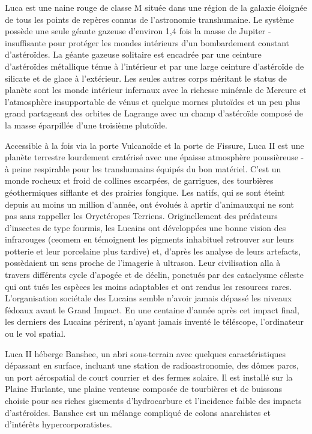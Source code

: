 Luca est une naine rouge de classe M située dans une région de la galaxie éloignée de tous les points de repères connus de l'astronomie transhumaine. Le système possède une seule géante gazeuse d'environ 1,4 fois la masse de Jupiter - insuffisante pour protéger les mondes intérieurs d'un bombardement constant d'astéroïdes. La géante gazeuse solitaire est encadrée par une ceinture d'astéroïdes métallique ténue à l'intérieur et par une large ceinture d'astéroïde de silicate et de glace à l'extérieur. Les seules autres corps méritant le status de planète sont les monde intérieur infernaux avec la richesse minérale de Mercure et l'atmosphère insupportable de vénus et quelque mornes plutoïdes et un peu plus grand partageant des orbites de Lagrange avec un champ d'astéroïde composé de la masse éparpillée d'une troisième plutoïde. 

Accessible à la fois via la porte Vulcanoïde et la porte de Fissure, Luca II est une planète terrestre lourdement cratérisé avec une épaisse atmosphère poussièreuse - à peine respirable pour les transhumains équipés du bon matériel. C'est un monde rocheux et froid de collines escarpées, de garrigues, des tourbières géothermiques sifflante et des prairies fongique. Les natifs, qui se sont éteint depuis au moins un million d'année, ont évolués à aprtir d'animauxqui ne sont pas sans rappeller les Oryctéropes Terriens. Originellement des prédateurs d'insectes de type fourmis, les Lucains ont développées une bonne vision des infrarouges (ceomem en témoignent les pigments inhabituel retrouver sur leurs potterie et leur porcelaine plus tardive) et, d'après les analyse de leurs artefacts, possèdaient un sens proche de l'imagerie à ultrason. Leur civilisation alla à travers différents cycle d'apogée et de déclin, ponctués par des cataclysme céleste qui ont tués les espèces les moins adaptables et ont rendus les resources rares. L'organisation sociétale des Lucains semble n'avoir jamais dépassé les niveaux fédoaux avant le Grand Impact. En une centaine d'année après cet impact final, les derniers des Lucains périrent, n'ayant jamais inventé le téléscope, l'ordinateur ou le vol spatial. 

Luca II héberge Banshee, un abri sous-terrain avec quelques caractéristiques dépassant en surface, incluant une station de radioastronomie, des dômes parcs, un port aérospatial de court courrier et des fermes solaire. Il est installé sur la Plaine Hurlante, une plaine venteuse composée de tourbières et de buissons choisie pour ses riches gisements d'hydrocarbure et l'incidence faible des impacts d'astéroïdes. Banshee est un mélange compliqué de colons anarchistes et d'intérêts hypercorporatistes. 

